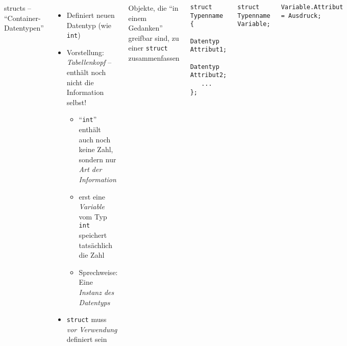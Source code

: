 \begin{frame}[fragile]%
%
\begin{columns}[b]
\begin{Large}
structs -- \enquote{Container-Datentypen}
\vspace{-5pt}
\end{Large}
%
\begin{itemize}
\item Definiert neuen Datentyp (wie \texttt{int})
\item Vorstellung: \emph{Tabellenkopf} -- enthält noch nicht die Information selbst!
	\begin{itemize}
	\item \enquote{\texttt{int}} enthält auch noch keine Zahl, sondern nur \emph{Art der
		Information}
	\item erst eine \emph{Variable} vom Typ \texttt{int} speichert tatsächlich die Zahl
	\item Sprechweise: Eine \emph{Instanz des Datentyps}
	\end{itemize}
\item \texttt{struct} muss \emph{vor Verwendung} definiert sein
\end{itemize}
\begin{hintbox}
\small Objekte, die \enquote{in einem Gedanken} greifbar sind, zu einer \texttt{struct} zusammenfassen
\end{hintbox}
%
\begin{codebox}
\begin{verbatim}
struct Typenname {
   Datentyp Attribut1;
   Datentyp Attribut2;
   ...
};
\end{verbatim}
\end{codebox}
%
\begin{codebox}
\begin{verbatim}
struct Typenname Variable;
\end{verbatim}
\end{codebox}
%
\begin{codebox}
\begin{verbatim}
Variable.Attribut = Ausdruck;
\end{verbatim}
\end{codebox}
\end{columns}
%

\end{frame}

